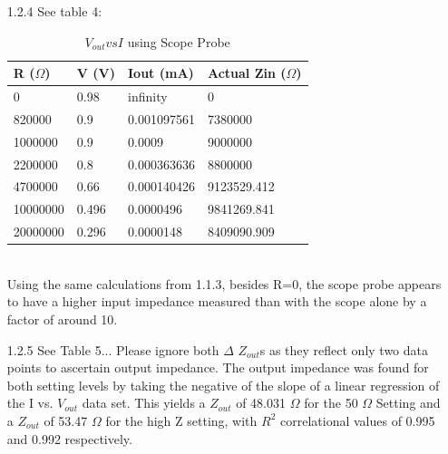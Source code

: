 \documentclass{article}
\begin{document}
\begin{itemize}
    
    \item[1.2.4] See table 4:\\
    \begin{table}[h]
    \centering
    \caption{$V_{out} vs I$ using Scope Probe}
    \label{my-label}
    \begin{tabular}{llll}
    \textbf{R ($\Omega$)} & \textbf{V (V)} & \textbf{Iout (mA)} & \textbf{Actual Zin ($\Omega$)} \\ \hline
    0                     & 0.98           & infinity           & 0                              \\
    820000                & 0.9            & 0.001097561        & 7380000                        \\
    1000000               & 0.9            & 0.0009             & 9000000                        \\
    2200000               & 0.8            & 0.000363636        & 8800000                        \\
    4700000               & 0.66           & 0.000140426        & 9123529.412                    \\
    10000000              & 0.496          & 0.0000496          & 9841269.841                    \\
    20000000              & 0.296          & 0.0000148          & 8409090.909                   
    \end{tabular}
    \end{table}\\ Using the same calculations from 1.1.3, besides R=0, the scope probe appears to have a higher input impedance measured than with the scope alone by a factor of around 10.
    
    
    \item[1.2.5] See Table 5... Please ignore both $\Delta$
    $Z_{out}$s as they reflect only two data points to ascertain output impedance. The output impedance was found for both setting levels by taking the negative of the slope of a linear regression of the I vs. $V_{out}$ data set. This yields a $Z_{out}$ of 48.031 $\Omega$ for the 50 $\Omega$ Setting and a $Z_{out}$ of 53.47 $\Omega$ for the high Z setting, with $R^{2}$ correlational values of 0.995 and 0.992 respectively.


\end{itemize}
\end{document}
